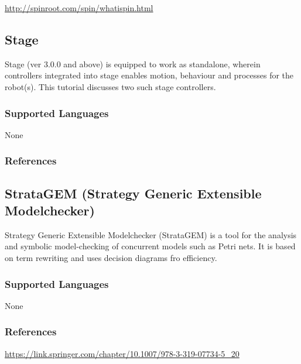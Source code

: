\url{http://spinroot.com/spin/whatispin.html}



\subsection{Stage}
\label{subsecT:Stage}


Stage (ver 3.0.0 and above) is equipped to work as standalone, wherein controllers integrated into stage enables motion, behaviour and processes for the robot(s). This tutorial discusses two such stage controllers.

\subsubsection{Supported Languages}

None


\subsubsection{References}





\subsection{StrataGEM (Strategy Generic Extensible Modelchecker)}
\label{subsecT:StrataGEM}



Strategy Generic Extensible Modelchecker (StrataGEM) is a tool for the analysis and symbolic model-checking of concurrent models such as Petri nets. It is based on term rewriting and uses decision diagrams fro efficiency.


\subsubsection{Supported Languages}

None


\subsubsection{References}

\url{https://link.springer.com/chapter/10.1007/978-3-319-07734-5_20}




